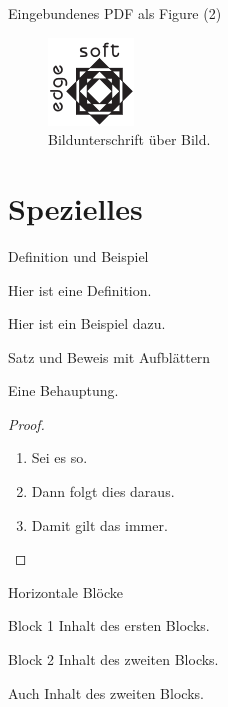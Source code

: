 \documentclass[ngerman]{scrartcl}
\begin{document}
	\begin{frame}{Eingebundenes PDF als Figure (2)}
		\begin{figure}
			\caption{Bildunterschrift über Bild.}
			\includegraphics{testlogo}
		\end{figure}
	\end{frame}

	\section{Spezielles}

	\begin{frame}{Definition und Beispiel}
		\begin{definition}
			Hier ist eine Definition.
		\end{definition}
		\begin{example}
			Hier ist ein Beispiel dazu.
		\end{example}
	\end{frame}

	\begin{frame}{Satz und Beweis mit Aufblättern}
		\begin{theorem}
			Eine Behauptung.
		\end{theorem}
		\begin{proof}
			\begin{enumerate}
				\item<1-> Sei es so.
				\item<2-> Dann folgt dies daraus.
				\item<1-> Damit gilt das immer.\qedhere
			\end{enumerate}
		\end{proof}
	\end{frame}

	\begin{frame}{Horizontale Blöcke}
		\begin{block}{Block 1}
			Inhalt des ersten Blocks.
		\end{block}
		\begin{block}{Block 2}
			Inhalt des zweiten Blocks.

			Auch Inhalt des zweiten Blocks.
		\end{block}
	\end{frame}
\end{document}
